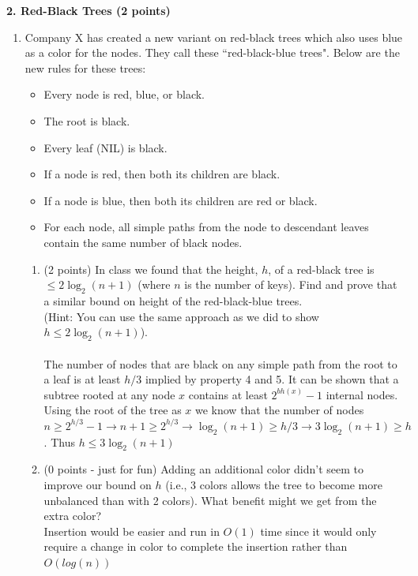 \documentclass[12pt]{elsart}
\begin{document}
{\bf 2.  Red-Black Trees (2 points)}

\begin{enumerate}
\item Company X has created a new variant on red-black trees which also uses blue as a color for the nodes.  They call these ``red-black-blue trees".  Below are the new rules for these trees:\\

\begin{itemize}
   \item Every node is red, blue, or black.
   \item  The root is black.
   \item Every leaf (NIL) is black.
   \item If a node is red, then both its children are black.
   \item If a node is blue, then both its children are red or black.
   \item For each node, all simple paths from the node to descendant leaves contain the
same number of black nodes.\\
\end{itemize}

\begin{enumerate}
   \item (2 points) In class we found that the height, $h$, of a red-black tree is $\leq 2\log_2(n+1)$ (where $n$ is the number of keys).  Find and prove that a similar bound on height of the red-black-blue trees.
\\(Hint: You can use the same approach as we did to show\\ $h \leq 2\log_2(n+1)$).\\\\
      The number of nodes that are black on any simple path from the root to a leaf is at least $h / 3$ implied by property 4 and 5. It can be shown that a subtree rooted at any node $x$ contains at least $2^{bh(x)} - 1$ internal nodes. Using the root of the tree as $x$ we know that the number of nodes $n \geq 2^{h / 3} - 1 \rightarrow n + 1 \geq 2^{h / 3} \rightarrow \log_2(n + 1) \geq h / 3 \rightarrow 3\log_2(n + 1) \geq h$. Thus $h \leq 3\log_2(n+1)$\\

   \item (0 points - just for fun) Adding an additional color didn't seem to improve our bound on $h$ (i.e., 3 colors allows the tree to become more unbalanced than with 2 colors).    What benefit might we get from the extra color?\\
      Insertion would be easier and run in $O(1)$ time since it would only require a change in color to complete the insertion rather than $O(log(n))$
\end{enumerate}

\end{enumerate}
\end{document}
